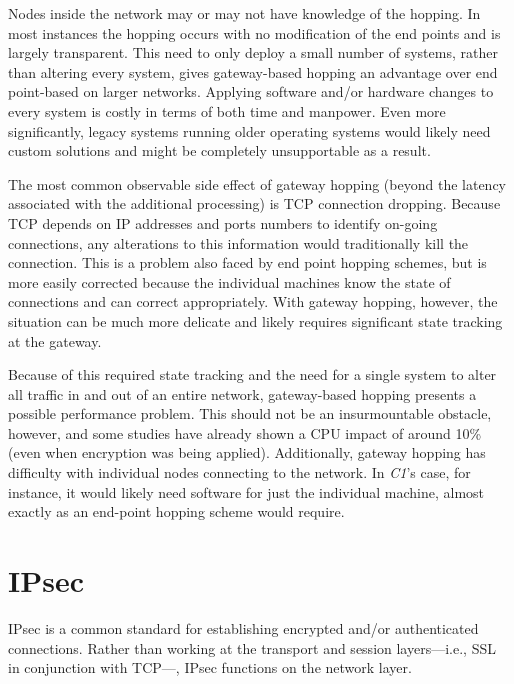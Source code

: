 \par Nodes inside the network may or may not have knowledge of the hopping. In most instances the hopping occurs with no modification of the end points and is largely transparent. This need to only deploy a small number of systems, rather than altering every system, gives gateway-based hopping an advantage over end point-based on larger networks. Applying software and/or hardware changes to every system is costly in terms of both time and manpower. Even more significantly, legacy systems running older operating systems would likely need custom solutions and might be completely unsupportable as a result.

\par The most common observable side effect of gateway hopping (beyond the latency associated with the additional processing) is TCP connection dropping. Because TCP depends on IP addresses and ports numbers to identify on-going connections, any alterations to this information would traditionally kill the connection. This is a problem also faced by end point hopping schemes, but is more easily corrected because the individual machines know the state of connections and can correct appropriately. With gateway hopping, however, the situation can be much more delicate and likely requires significant state tracking at the gateway.

\par Because of this required state tracking and the need for a single system to alter all traffic in and out of an entire network, gateway-based hopping presents a possible performance problem. This should not be an insurmountable obstacle, however, and some studies have already shown a CPU impact of around 10\% \cite{TAO} (even when encryption was being applied). Additionally, gateway hopping has difficulty with individual nodes connecting to the network. In \textit{C1}'s case, for instance, it would likely need software for just the individual machine, almost exactly as an end-point hopping scheme would require.

\section{IPsec}
\label{sec:ipsec}
\par IPsec is a common standard for establishing encrypted and/or authenticated connections. Rather than working at the transport and session layers---i.e., SSL in conjunction with TCP---, IPsec functions on the network layer.   

